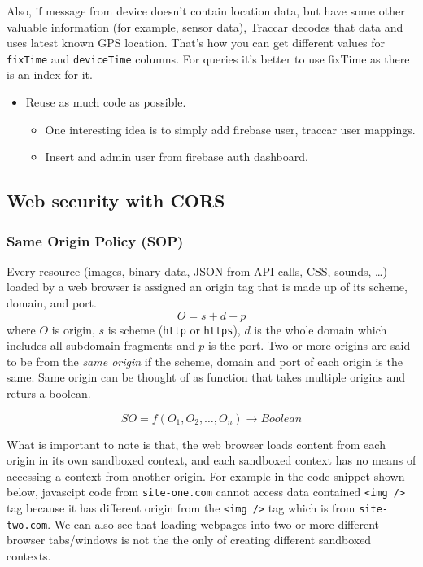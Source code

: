 \documentclass[a4paper]{article}
\begin{document}
Also, if message from device doesn't contain location data, but have some other valuable information (for example, sensor data), 
Traccar decodes that data and uses latest known GPS location. That's how you can get different values for \lstinline{fixTime} and 
\lstinline{deviceTime} columns. For queries it's better to use fixTime as there is an index for it.



\begin{itemize}
    \item Reuse as much code as possible.
          \begin{itemize}
              \item One interesting idea is to simply add firebase user, traccar user mappings.
              \item Insert and admin user from firebase auth dashboard.
          \end{itemize}
\end{itemize}


\subsection*{Web security with CORS}
\subsubsection*{Same Origin Policy (SOP)}

Every resource (images, binary data, JSON from API calls, CSS, sounds, \ldots) loaded by a web browser is assigned an origin tag that 
is made up of its scheme, domain, and port.
\[
    O = s + d + p  
\]
where \(O\) is origin, \(s\) is scheme (\lstinline{http} or \lstinline{https}), \(d\) is the whole domain which includes all subdomain
fragments and \(p\) is the port. Two or more origins are said to be from the \emph{same origin} if the scheme, domain and port 
of each origin is the same. Same origin can be thought of as function that takes multiple origins and returs a boolean.

\[
    SO = f(O_1, O_2, \ldots, O_n) \rightarrow Boolean
\]

\lstset{style=custom-html}

What is important to note is that, the web browser loads content from each origin in its own sandboxed context, and each sandboxed
context has no means of accessing a context from another origin. For example in the code snippet shown below, javascipt code from 
\lstinline{site-one.com} cannot access data contained \lstinline{<img />} tag because it has different origin from the 
\lstinline{<img />} tag which is from \lstinline{site-two.com}. We can also see that loading webpages into two or more different
browser tabs/windows is not the the only of creating different sandboxed contexts.
\end{document}
